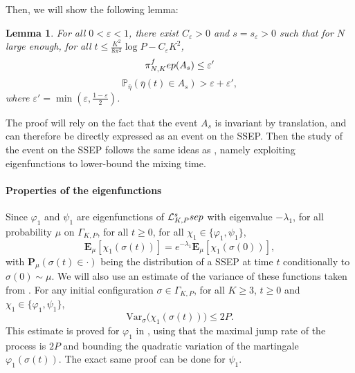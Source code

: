 \documentclass[11pt,a4paper]{article}
\newcommand{\PP}{\mathbb{P}}
\newcommand{\bP}{\textbf{P}}
\newcommand{\FEP}{\textsc{fep}}
\newcommand{\SSEP}{\textsc{ssep}}
\newtheorem{lemma}[theorem]{Lemma}
\newcommand{\eq}[2]{\begin{equation}\label{#1}#2\end{equation}}
\begin{document}
Then, we will show the following lemma:
\begin{lemma} For all $0<\varepsilon<1$, there exist $C_{\varepsilon}>0$ and $s=s_\varepsilon >0 $ such that for $N$ large enough, 
for all $t \le \frac{K^2}{8\pi^2} \log P - C_\varepsilon K^2$, 
\eq{eq:piA1}{\pi_{N,K}^\FEP(A_s) \le \varepsilon'}
\eq{eq:2eps1}{\PP_{\bar{\eta}}(\bar{\eta}(t) \in A_s) > \varepsilon+\varepsilon',}
where $\varepsilon' = \min(\varepsilon, \frac{1-\varepsilon}{2})$.
\end{lemma}

The proof will rely on the fact that the event $A_s$ is invariant by translation, and can therefore be directly expressed as an event on the SSEP. Then the study of the event on the SSEP follows the same ideas as \cite[Section 2]{lacoin_simple_2017}, namely exploiting eigenfunctions to lower-bound the mixing time. 
\paragraph{Properties of the eigenfunctions} Since $\varphi_1$ and $\psi_1$ are eigenfunctions of $\mathcal{L}_{K,P}^\SSEP$ with eigenvalue $-\lambda_1$, for all probability $\mu$ on $\Gamma_{K,P}$, for all $t\ge 0$, for all $\chi_1 \in \{\varphi_1,\psi_1\}$,
\eq{eq:eig_gen}{\mathbf{E}_\mu\left[\chi_1\left(\sigma(t)\right)\right] = e^{-\lambda_1}\mathbf{E}_\mu\left[\chi_1\left(\sigma(0)\right)\right] ,}
with $\bP_\mu\left(\sigma(t)\in\cdot\right)$ being the distribution of a SSEP at time $t$ conditionally to $\sigma(0) \sim \mu$. We will also use an estimate of the variance of these functions taken from \cite[Section 2.2]{lacoin_simple_2017}. For any initial configuration $\sigma \in \Gamma_{K,P}$, for all $K\ge 3$, $t\ge 0$ and $\chi_1\in\{\varphi_1,\psi_1\}$, 
\eq{eq:var_eig}{\mathrm{Var}_\sigma\big(\chi_1\left(\sigma(t)\right)\big) \le 2P.}
This estimate is proved for $\varphi_1$ in \cite[Section 2.2]{lacoin_simple_2017}, using that the maximal jump rate of the process is $2P$ and bounding the quadratic variation of the martingale $\varphi_1\left(\sigma(t)\right)$. The exact same proof can be done for $\psi_1$.
\end{document}
